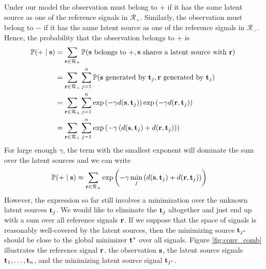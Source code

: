 Under our model the observation must belong to $+$ if it has the same
latent source as one of the reference signals in $\mathcal{R}_+$. Similarly, the
observation must belong to $-$ if it has the same latent source as one of the
reference signals in $\mathcal{R}_-$. Hence, the probability that the
observation belongs to $+$ is
\begin{align}
\mathbb{P}(+ \;|\; \mathbf s) &= \sum_{\mathbf r \in \mathcal{R}_+} \mathbb{P}(\mathbf s \text{ belongs to } +, \mathbf s \text{ shares a latent source
  with } \mathbf r)\notag\\
&= \sum_{\mathbf r \in \mathcal{R}_+} \sum_{j = 1}^n \mathbb{P}( \mathbf s \text{ generated by }
\mathbf t_j, \mathbf r \text{ generated by } \mathbf t_j)\notag\\
&= \sum_{\mathbf r \in \mathcal{R}_+} \sum_{j = 1}^n \exp{\left(-\gamma
    d(\mathbf s,\mathbf t_j)\right)} \exp{\left(-\gamma d(\mathbf r,\mathbf t_j)\right)}\notag\\
&= \sum_{\mathbf r \in \mathcal{R}_+} \sum_{j = 1}^n \exp{\left(-\gamma\left(
    d(\mathbf s,\mathbf t_j) + d(\mathbf r,\mathbf t_j) \right)\right)}
\end{align}
For large enough $\gamma$, the term with the smallest exponent will dominate the sum
over the latent sources and we can write
\begin{align}
\mathbb{P}(+ \;|\; \mathbf s) &\approx \sum_{\mathbf r \in \mathcal{R}_+}
\exp{\left(-\gamma \min_{j} \left( d(\mathbf s,\mathbf t_j) + d(\mathbf r,\mathbf t_j) \right) \right)} \label{eqn:prob_plus}
\end{align}
However, the expression so far still involves a minimization over the unknown
latent sources $\mathbf t_j$. We would like to eliminate the $\mathbf t_j$ altogether
and just end up with a sum over all reference signals $\mathbf r$. If we suppose
that the space of signals is reasonably well-covered by the latent sources, then
the minimizing source $\mathbf t_{j^*}$ should be close to the global minimizer
$\mathbf t^*$ over all signals. Figure \ref{fig:conv_comb} illustrates the reference
signal $\mathbf r$, the observation $\mathbf s$, the latent source signals $\mathbf t_1, \dots,
\mathbf t_n$, and the minimizing latent source signal $\mathbf t_{j^*}$.
